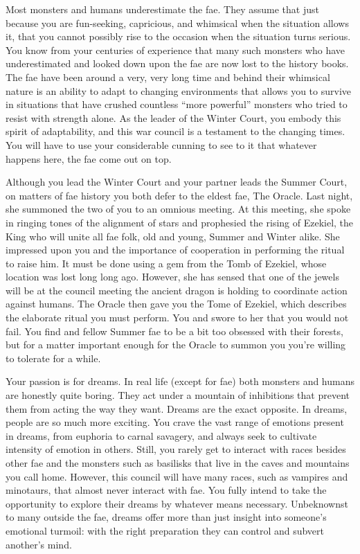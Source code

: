 \documentclass[char]{guildcamp2}
\begin{document}
\name{\cBabyFae{}}

Most monsters and humans underestimate the fae. They assume that just because you are fun-seeking, capricious, and whimsical when the situation allows it, that you cannot possibly rise to the occasion when the situation turns serious. You know from your centuries of experience that many such monsters who have underestimated and looked down upon the fae are now lost to the history books. The fae have been around a very, very long time and behind their whimsical nature is an ability to adapt to changing environments that allows you to survive in situations that have crushed countless ``more powerful'' monsters who tried to resist with strength alone. As the leader of the Winter Court, you embody this spirit of adaptability, and this war council is a testament to the changing times. You will have to use your considerable cunning to see to it that whatever happens here, the fae come out on top.

Although you lead the Winter Court and your partner \cTreeFae{\intro} leads the Summer Court, on matters of fae history you both defer to the eldest fae, The Oracle. Last night, she summoned the two of you to an omnious meeting. At this meeting, she spoke in ringing tones of the alignment of stars and prophesied the rising of Ezekiel, the King who will unite all fae folk, old and young, Summer and Winter alike.  She impressed upon you and \cTreeFae{} the importance of cooperation in performing the ritual to raise him. It must be done using a gem from the Tomb of Ezekiel, whose location was lost long long ago.  However, she has sensed that one of the jewels will be at the council meeting the ancient dragon \cOnyx{\intro} is holding to coordinate action against humans.  The Oracle then gave you the Tome of Ezekiel, which describes the elaborate ritual you must perform.  You and \cTreeFae{} swore to her that you would not fail. You find \cTreeFae{} and \cTreeFae{\their} fellow Summer fae to be a bit too obsessed with their forests, but for a matter important enough for the Oracle to summon you you're willing to tolerate \cTreeFae{\them} for a while.

Your passion is for dreams. In real life (except for fae) both monsters and humans are honestly quite boring. They act under a mountain of inhibitions that prevent them from acting the way they want. Dreams are the exact opposite. In dreams, people are so much more exciting. You crave the vast range of emotions present in dreams, from euphoria to carnal savagery, and always seek to cultivate intensity of emotion in others. Still, you rarely get to interact with races besides other fae and the monsters such as basilisks that live in the caves and mountains you call home. However, this council will have many races, such as vampires and minotaurs, that almost never interact with fae. You fully intend to take the opportunity to explore their dreams by whatever means necessary. Unbeknownst to many outside the fae, dreams offer more than just insight into someone's emotional turmoil: with the right preparation they can control and subvert another's mind.
\end{document}
